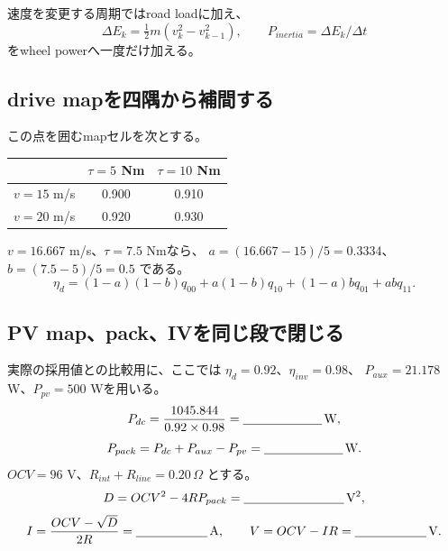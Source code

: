 速度を変更する周期ではroad loadに加え、
\[
\Delta E_k=\tfrac12m(v_k^2-v_{k-1}^2),\qquad
P_{inertia}=\Delta E_k/\Delta t
\]
をwheel powerへ一度だけ加える。

\subsection{drive mapを四隅から補間する}
この点を囲むmapセルを次とする。
\begin{center}
\begin{tabular}{c|cc}
 & $\tau=5$ Nm & $\tau=10$ Nm\\\hline
$v=15$ m/s & 0.900 & 0.910\\
$v=20$ m/s & 0.920 & 0.930
\end{tabular}
\end{center}
$v=16.667$ m/s、$\tau=7.5$ Nmなら、
$a=(16.667-15)/5=0.3334$、$b=(7.5-5)/5=0.5$ である。
\[
\eta_d=(1-a)(1-b)q_{00}+a(1-b)q_{10}
 +(1-a)bq_{01}+abq_{11}.
\]


\subsection{PV map、pack、IVを同じ段で閉じる}
実際の採用値との比較用に、ここでは $\eta_d=0.92$、$\eta_{inv}=0.98$、
$P_{aux}=21.178$ W、$P_{pv}=500$ Wを用いる。
\[
P_{dc}=\frac{1045.844}{0.92\times0.98}
=\underline{\hspace{22mm}}\,\mathrm{W},
\]
\[
P_{pack}=P_{dc}+P_{aux}-P_{pv}
=\underline{\hspace{22mm}}\,\mathrm{W}.
\]
$OCV=96$ V、$R_{int}+R_{line}=0.20\,\Omega$ とする。
\[
D=OCV^2-4RP_{pack}=\underline{\hspace{28mm}}\,\mathrm{V^2},
\]
\[
I=\frac{OCV-\sqrt D}{2R}=\underline{\hspace{20mm}}\,\mathrm{A},\qquad
V=OCV-IR=\underline{\hspace{20mm}}\,\mathrm{V}.
\]



